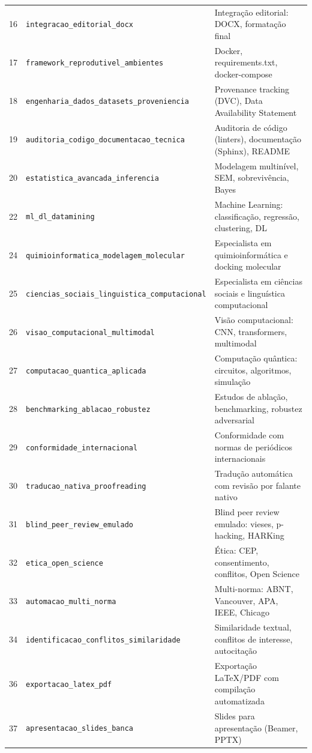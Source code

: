 \begin{longtable}{p{0.8cm} p{4.5cm} p{10cm}}
16 & \texttt{integracao\_editorial\_docx} & Integração editorial: DOCX, formatação final \\
17 & \texttt{framework\_reprodutivel\_ambientes} & Docker, requirements.txt, docker-compose \\
18 & \texttt{engenharia\_dados\_datasets\_proveniencia} & Provenance tracking (DVC), Data Availability Statement \\
19 & \texttt{auditoria\_codigo\_documentacao\_tecnica} & Auditoria de código (linters), documentação (Sphinx), README \\
20 & \texttt{estatistica\_avancada\_inferencia} & Modelagem multinível, SEM, sobrevivência, Bayes \\
22 & \texttt{ml\_dl\_datamining} & Machine Learning: classificação, regressão, clustering, DL \\
24 & \texttt{quimioinformatica\_modelagem\_molecular} & Especialista em quimioinformática e docking molecular \\
25 & \texttt{ciencias\_sociais\_linguistica\_computacional} & Especialista em ciências sociais e linguística computacional \\
26 & \texttt{visao\_computacional\_multimodal} & Visão computacional: CNN, transformers, multimodal \\
27 & \texttt{computacao\_quantica\_aplicada} & Computação quântica: circuitos, algoritmos, simulação \\
28 & \texttt{benchmarking\_ablacao\_robustez} & Estudos de ablação, benchmarking, robustez adversarial \\
29 & \texttt{conformidade\_internacional} & Conformidade com normas de periódicos internacionais \\
30 & \texttt{traducao\_nativa\_proofreading} & Tradução automática com revisão por falante nativo \\
31 & \texttt{blind\_peer\_review\_emulado} & Blind peer review emulado: vieses, p-hacking, HARKing \\
32 & \texttt{etica\_open\_science} & Ética: CEP, consentimento, conflitos, Open Science \\
33 & \texttt{automacao\_multi\_norma} & Multi-norma: ABNT, Vancouver, APA, IEEE, Chicago \\
34 & \texttt{identificacao\_conflitos\_similaridade} & Similaridade textual, conflitos de interesse, autocitação \\
36 & \texttt{exportacao\_latex\_pdf} & Exportação LaTeX/PDF com compilação automatizada \\
37 & \texttt{apresentacao\_slides\_banca} & Slides para apresentação (Beamer, PPTX) \\

\end{longtable}
